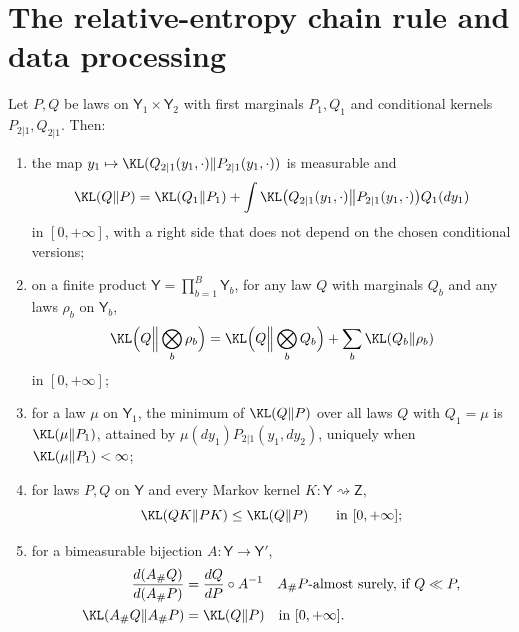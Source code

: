 \section{The relative-entropy chain rule and data processing}
\label{sec:prob-kl-chain-rule}

Let $P,Q$ be laws on $\mathsf Y_1\times\mathsf Y_2$ with first marginals $P_1,Q_1$ and conditional kernels
$P_{2|1},Q_{2|1}$. Then:
\begin{enumerate}
\item[(a)] the map $y_1\mapsto\KL(Q_{2|1}(y_1,\cdot)\Vert P_{2|1}(y_1,\cdot))$ is measurable and
\begin{equation}
\KL(Q\Vert P)
=\KL(Q_1\Vert P_1)
+\int\KL\bigl(Q_{2|1}(y_1,\cdot)\big\Vert P_{2|1}(y_1,\cdot)\bigr)Q_1(dy_1)
\label{eq:elbo-kl-chain-rule}
\end{equation}
in $[0,+\infty]$, with a right side that does not depend on the chosen conditional versions;
\item[(b)] on a finite product $\mathsf Y=\prod_{b=1}^B\mathsf Y_b$, for any law $Q$ with marginals $Q_b$
and any laws $\rho_b$ on $\mathsf Y_b$,
\begin{equation}
\KL\Bigl(Q\Big\Vert\bigotimes_b\rho_b\Bigr)
=\KL\Bigl(Q\Big\Vert\bigotimes_bQ_b\Bigr)+\sum_b\KL(Q_b\Vert\rho_b)
\label{eq:prob-kl-product-reference}
\end{equation}
in $[0,+\infty]$;
\item[(c)] for a law $\mu$ on $\mathsf Y_1$, the minimum of $\KL(Q\Vert P)$ over all laws $Q$ with
$Q_1=\mu$ is $\KL(\mu\Vert P_1)$, attained by $\mu(dy_1)P_{2|1}(y_1,dy_2)$, uniquely when
$\KL(\mu\Vert P_1)<\infty$;
\item[(d)]\label{thm:cg-kl-dpi-extended} for laws $P,Q$ on $\mathsf Y$ and every Markov kernel
$K:\mathsf Y\rightsquigarrow\mathsf Z$,
\begin{equation}
\KL(QK\Vert PK)\leq\KL(Q\Vert P)
\qquad\text{in }[0,+\infty];
\label{eq:cg-kl-dpi-extended}
\end{equation}
\item[(e)] for a bimeasurable bijection $A:\mathsf Y\to\mathsf Y'$,
\begin{align}
\frac{d(A_\#Q)}{d(A_\#P)}&=\frac{dQ}{dP}\circ A^{-1}
\quad A_\#P\text{-almost surely, if }Q\ll P,
\label{eq:cg-rn-bimeasurable}\\
\KL(A_\#Q\Vert A_\#P)&=\KL(Q\Vert P)
\quad\text{in }[0,+\infty].
\label{eq:cg-kl-bimeasurable-invariance}
\end{align}
\end{enumerate}

